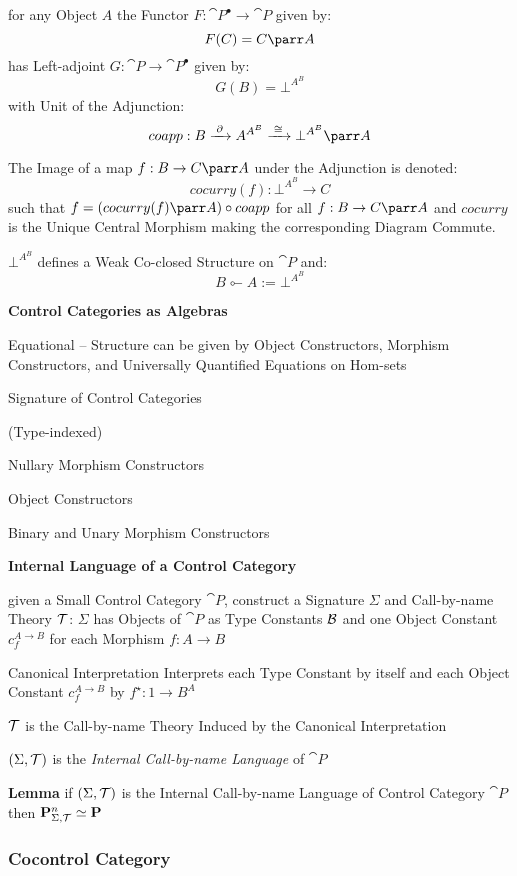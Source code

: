 for any Object $A$ the Functor $F : \cat{P}^\bullet \rightarrow
\cat{P}$ given by:
\[
  F(C) = C \parr A
\]
has Left-adjoint $G : \cat{P} \rightarrow \cat{P}^\bullet$ given by:
\[
  G(B) = \bot^{A^B}
\]
with Unit of the Adjunction:
\[
  coapp : B \xrightarrow{\;\partial\;} A^{A^B} \xrightarrow{\;\cong\;}
    \bot^{A^B} \parr A
\]

The Image of a map $f : B \rightarrow C \parr A$ under the Adjunction
is denoted:
\[
  cocurry(f) : \bot^{A^B} \rightarrow C
\]
such that $f = (cocurry(f) \parr A) \circ coapp$ for all $f : B
\rightarrow C \parr A$ and $cocurry$ is the Unique Central Morphism
making the corresponding Diagram Commute.

$\bot^{A^B}$ defines a Weak Co-closed Structure on $\cat{P}$ and:
\[
  B \multimapinv A := \bot^{A^B}
\]


\textbf{Control Categories as Algebras}

Equational -- Structure can be given by Object Constructors, Morphism
Constructors, and Universally Quantified Equations on Hom-sets

Signature of Control Categories

(Type-indexed)

Nullary Morphism Constructors

Object Constructors

Binary and Unary Morphism Constructors



\textbf{Internal Language of a Control Category}

given a Small Control Category $\cat{P}$, construct a Signature
$\Sigma$ and Call-by-name Theory $\mathcal{T}$: $\Sigma$ has Objects of
$\cat{P}$ as Type Constants $\mathcal{B}$ and one Object Constant
$c_f^{A \rightarrow B}$ for each Morphism $f : A \rightarrow B$

Canonical Interpretation Interprets each Type Constant by
itself and each Object Constant $c_f^{A \rightarrow B}$ by $f^\star :
1 \rightarrow B^A$

$\mathcal{T}$ is the Call-by-name Theory Induced by the Canonical
Interpretation

$(\Sigma,\mathcal{T})$ is the \emph{Internal Call-by-name Language} of
$\cat{P}$

\textbf{Lemma} if $(\Sigma,\mathcal{T})$ is the Internal Call-by-name
Language of Control Category $\cat{P}$ then
$\mathbf{P}^n_{\Sigma,\mathcal{T}} \simeq \mathbf{P}$



\subsubsection{Cocontrol Category}\label{sec:cocontrol_category}

